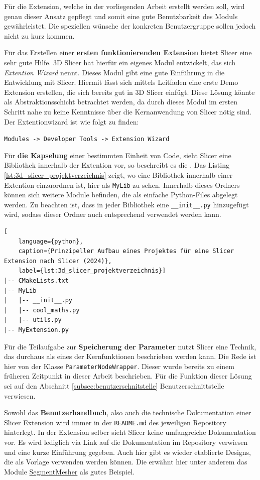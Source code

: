 Für die Extension, welche in der vorliegenden Arbeit erstellt werden soll, wird genau
dieser Ansatz gepflegt und somit eine gute Benutzbarkeit des Moduls gewährleistet.
Die speziellen wünsche der konkreten Benutzergruppe sollen jedoch nicht zu kurz
kommen.

Für das Erstellen einer \textbf{ersten funktionierenden Extension} bietet Slicer
eine sehr gute Hilfe. 3D Slicer hat hierfür ein eigenes Modul entwickelt, das sich
\textit{Extention Wizard} nennt. Dieses Modul gibt eine gute Einführung in die Entwicklung
mit Slicer. Hiermit lässt sich mittels Leitfaden eine erste Demo Extension
erstellen, die sich bereits gut in 3D Slicer einfügt. Diese Lösung könnte als
Abstraktionsschicht betrachtet werden, da durch dieses Modul im ersten Schritt nahe
zu keine Kenntnisse über die Kernanwendung von Slicer nötig sind. Der
Extentionwizard ist wie folgt zu finden:

\texttt{Modules -> Developer Tools -> Extension Wizard}

Für \textbf{die Kapselung} einer bestimmten Einheit von Code, sieht Slicer eine
Bibliothek innerhalb der Extention vor, so beschreibt es die \citet{slicer2024}.
Das Listing \ref{lst:3d_slicer_projektverzeichnis} zeigt, wo eine Bibliothek
innerhalb einer Extention einzuordnen ist, hier als \texttt{MyLib} zu sehen. Innerhalb
dieses Ordners können sich weitere Module befinden, die als einfache Python-Files
abgelegt werden. Zu beachten ist, dass in jeder Bibliothek eine \texttt{\_\_init\_\_.py}
hinzugefügt wird, sodass dieser Ordner auch entsprechend verwendet werden kann.

\begin{lstlisting}[
    language={python},
    caption={Prinzipeller Aufbau eines Projektes für eine Slicer Extension nach Slicer (2024)},
    label={lst:3d_slicer_projektverzeichnis}]
|-- CMakeLists.txt
|-- MyLib
|   |-- __init__.py
|   |-- cool_maths.py
|   |-- utils.py
|-- MyExtension.py
\end{lstlisting}

Für die Teilaufgabe zur \textbf{Speicherung der Parameter} nutzt Slicer eine
Technik, das durchaus als eines der Kernfunktionen beschrieben werden kann. Die
Rede ist hier von der Klasse \texttt{ParameterNodeWrapper}. Dieser wurde bereits
zu einem früheren Zeitpunkt in dieser Arbeit beschrieben. Für die Funktion dieser
Lösung sei auf den Abschnitt \ref{subsec:benutzerschnitstelle} Benutzerschnittstelle
verwiesen.

Sowohl das \textbf{Benutzerhandbuch}, also auch die technische Dokumentation einer
Slicer Extension wird immer in der \texttt{README.md} des jeweiligen Repository
hinterlegt. In der Extension selber sieht Slicer keine umfangreiche Dokumentation
vor. Es wird lediglich via Link auf die Dokumentation im Repository verwiesen
und eine kurze Einführung gegeben. Auch hier gibt es wieder etablierte Designs,
die als Vorlage verwenden werden können. Die \citet{slicer2024} erwähnt hier
unter anderem das Module
\href{https://github.com/lassoan/SlicerSegmentMesher}{SegmentMesher} als gutes
Beispiel.

